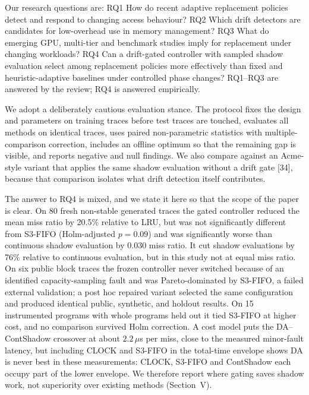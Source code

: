 \documentclass[10pt,twocolumn,a4paper]{IEEEtran}
\begin{document}
Our research questions are: RQ1 How do recent adaptive replacement policies
detect and respond to changing access behaviour? RQ2 Which drift detectors are
candidates for low-overhead use in memory management? RQ3 What do emerging
GPU, multi-tier and benchmark studies imply for replacement under changing
workloads? RQ4 Can a drift-gated controller with sampled shadow evaluation
select among replacement policies more effectively than fixed and
heuristic-adaptive baselines under controlled phase changes? RQ1--RQ3 are
answered by the review;
RQ4 is answered empirically.

We adopt a deliberately cautious evaluation stance. The protocol fixes the
design and parameters on training traces before test traces are touched,
evaluates all methods on identical traces, uses paired non-parametric
statistics with multiple-comparison correction, includes an offline optimum so
that the remaining gap is visible, and reports negative and null findings. We
also compare against an Acme-style variant that applies the same shadow
evaluation without a drift gate [34], because that comparison isolates what
drift detection itself contributes.

The answer to RQ4 is mixed, and we state it here so that the scope of the
paper is clear. On 80 fresh non-stable generated traces the gated controller
reduced the mean miss ratio by 20.5\% relative to LRU, but was not
significantly different from S3-FIFO (Holm-adjusted $p = 0.09$) and was
significantly worse than continuous shadow evaluation by 0.030 miss ratio. It
cut shadow evaluations by 76\% relative to continuous evaluation, but in this
study not at equal miss ratio. On six public block traces the frozen controller
never switched because of an identified capacity-sampling fault and was
Pareto-dominated by S3-FIFO, a failed external validation; a post hoc repaired
variant selected the same configuration and produced identical public, synthetic, and holdout results. On 15 instrumented programs with whole programs
held out it tied S3-FIFO at higher cost, and no comparison survived Holm
correction. A cost model puts the DA--ContShadow crossover at about $2.2\,\mu$s per miss,
close to the measured minor-fault latency, but including CLOCK and S3-FIFO in
the total-time envelope shows DA is never best in these measurements: CLOCK,
S3-FIFO and ContShadow each occupy part of the lower envelope. We therefore
report where gating saves shadow work, not superiority over existing methods
(Section~V).
\end{document}
